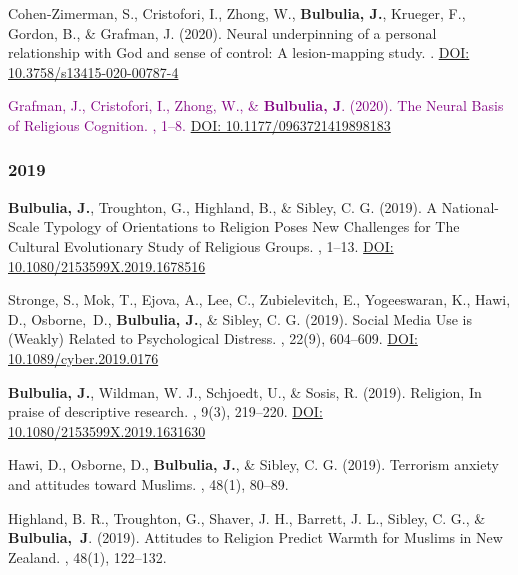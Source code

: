\documentclass{article}
\begin{document}
\begin{thebibliography}{99}
 Cohen-Zimerman, S., Cristofori, I., Zhong, W., {\bf Bulbulia, J.}, Krueger, F., Gordon, B., \& Grafman, J. (2020).
\newblock Neural underpinning of a personal relationship with God and sense of control: A lesion-mapping study.
.
\href{https://doi.org/10.3758/s13415-020-00787-4}{DOI: 10.3758/s13415-020-00787-4}


 \textcolor{purple}{ Grafman, J., Cristofori, I., Zhong, W., \& {\bf Bulbulia, J}. (2020).
\newblock The Neural Basis of Religious Cognition.
, 1--8.
\href{https://doi.org/10.1177/0963721419898183}{DOI: 10.1177/0963721419898183}}



\subsubsection*{2019}



 {\bf Bulbulia, J.}, Troughton, G., Highland, B., \& Sibley, C. G.  (2019).
\newblock A National-Scale Typology of Orientations to Religion Poses New Challenges for The Cultural Evolutionary Study of Religious Groups. 
, 1--13. 
\href{https://doi.org/10.1080/2153599X.2019.1678516}{DOI: 10.1080/2153599X.2019.1678516}


 Stronge, S., Mok, T., Ejova, A., Lee, C., Zubielevitch, E., Yogeeswaran, K., Hawi, D., Osborne,~D., {\bf Bulbulia, J.}, \& Sibley, C. G. (2019).
\newblock Social Media Use is (Weakly) Related to Psychological Distress. 
, 22(9), 604--609.
\href{https://doi.org/10.1089/cyber.2019.0176}{DOI: 10.1089/cyber.2019.0176}


{\bf  Bulbulia, J.}, Wildman, W. J., Schjoedt, U., \& Sosis, R. (2019).
\newblock Religion, In praise of descriptive research.  
, 9(3), 219--220. 
\href{https://doi.org/10.1080/2153599X.2019.1631630}{DOI: 10.1080/2153599X.2019.1631630}


Hawi, D., Osborne, D., {\bf Bulbulia, J.}, \& Sibley, C. G. (2019). 
\newblock Terrorism anxiety and attitudes toward Muslims. 
, 48(1), 80--89.


Highland, B. R., Troughton, G., Shaver, J. H., Barrett, J. L., Sibley, C. G., \&
{\bf Bulbulia,~J}. (2019).
\newblock  Attitudes to Religion Predict Warmth for Muslims in New Zealand.
,  48(1), 122--132.



\end{thebibliography}
\end{document}
